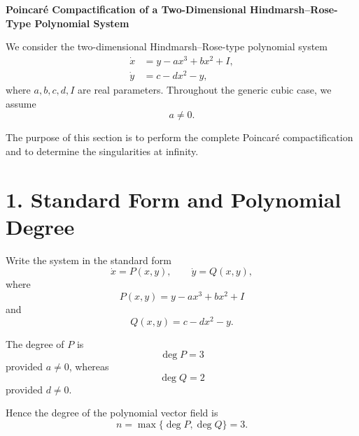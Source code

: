 \documentclass[11pt,a4paper]{article}
\begin{document}
\begin{center}
    {\Large\bf Poincaré Compactification of a Two-Dimensional
    Hindmarsh--Rose-Type Polynomial System}
\end{center}

\vspace{0.5cm}

We consider the two-dimensional Hindmarsh--Rose-type polynomial system
\begin{equation}
\boxed{
\begin{aligned}
\dot{x} &= y-a x^3+b x^2+I,\\
\dot{y} &= c-dx^2-y,
\end{aligned}}
\tag{HR}
\end{equation}
where $a,b,c,d,I$ are real parameters. Throughout the generic
cubic case, we assume
\begin{equation}
a\neq 0.
\end{equation}

The purpose of this section is to perform the complete Poincaré
compactification and to determine the singularities at infinity.

\section{1. Standard Form and Polynomial Degree}

Write the system in the standard form
\begin{equation}
\dot{x}=P(x,y),\qquad
\dot{y}=Q(x,y),
\end{equation}
where
\begin{equation}
\boxed{
P(x,y)=y-a x^3+b x^2+I
}
\end{equation}
and
\begin{equation}
\boxed{
Q(x,y)=c-dx^2-y.
}
\end{equation}

The degree of $P$ is
\begin{equation}
\deg P=3
\end{equation}
provided $a\neq0$, whereas
\begin{equation}
\deg Q=2
\end{equation}
provided $d\neq0$.

Hence the degree of the polynomial vector field is
\begin{equation}
\boxed{
n=\max\{\deg P,\deg Q\}=3.
}
\tag{1}
\end{equation}
\end{document}
